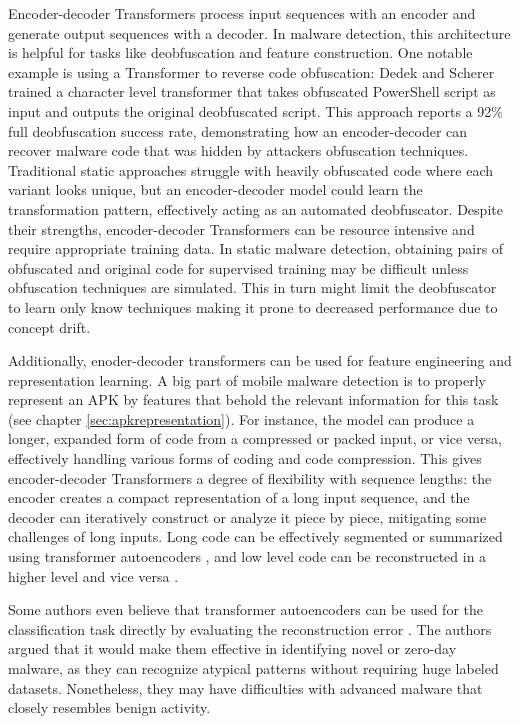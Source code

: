 Encoder-decoder Transformers process input sequences with an encoder and generate output 
sequences with a decoder. 
In malware detection, this architecture is helpful for tasks like deobfuscation and 
feature construction. 
One notable example is using a Transformer to reverse code obfuscation: 
Dedek and Scherer \cite{tbased_deobfuscation} trained a character level transformer 
that takes obfuscated PowerShell 
script as input and outputs the original deobfuscated script. 
This approach reports a 92\% full deobfuscation success rate, 
demonstrating how an encoder-decoder can recover malware code that was hidden by attackers obfuscation 
techniques. 
Traditional static approaches struggle with heavily obfuscated code where each variant looks unique, 
but an encoder-decoder model could learn the transformation pattern, 
effectively acting as an automated deobfuscator. 
Despite their strengths, encoder-decoder Transformers can be resource 
intensive and require appropriate training data. In static malware detection, obtaining pairs of 
obfuscated and original code for supervised training may be difficult unless obfuscation techniques 
are simulated. This in turn might limit the deobfuscator to learn only know techniques making it prone to
decreased performance due to concept drift. 

Additionally, enoder-decoder transformers can be used for feature engineering and representation learning.
A big part of mobile malware detection is to properly represent an APK by features that behold 
the relevant information for this task (see chapter \ref{sec:apkrepresentation}).
For instance, the model can produce a longer, expanded form of code from a compressed or packed input, 
or vice versa, effectively handling various forms of coding and code compression. 
This gives encoder-decoder Transformers a degree of flexibility with sequence lengths: 
the encoder creates a compact representation of a long input sequence, and the decoder can iteratively 
construct or analyze it piece by piece, mitigating some challenges of long inputs.
Long code can be effectively segmented or summarized using transformer autoencoders \cite{tbased_codesum}, 
and low level code can be reconstructed in a higher level and 
vice versa \cite{tbased_codetran}.

Some authors even believe that transformer autoencoders can be used for the classification task directly
by evaluating the reconstruction error \cite{transformer_malware_overview}. 
The authors argued that it would make them effective in identifying novel or zero-day malware, 
as they can recognize atypical patterns without requiring huge labeled datasets. 
Nonetheless, they may have difficulties with advanced malware that closely resembles benign activity.

